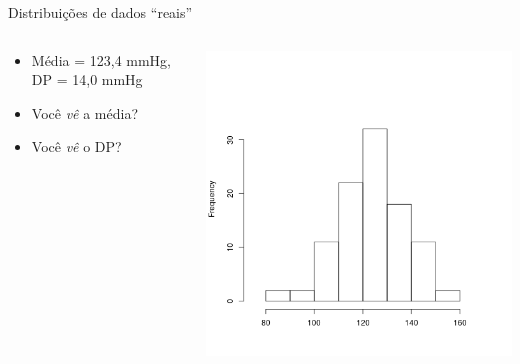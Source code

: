\documentclass{beamer}
\begin{document}
\begin{frame}{Distribuições de dados ``reais''}
  \begin{columns}
    \begin{column}{5cm}
      \begin{itemize}
      \item Média = 123,4 mmHg, DP = 14,0 mmHg
      \item Você  {\em vê} a média?
      \item Você  {\em vê} o DP?
      \end{itemize}
    \end{column}
    \begin{column}{5cm}
      \includegraphics[width=\textwidth]{Cap4/normal1}
    \end{column}
  \end{columns}
\end{frame}
\end{document}
